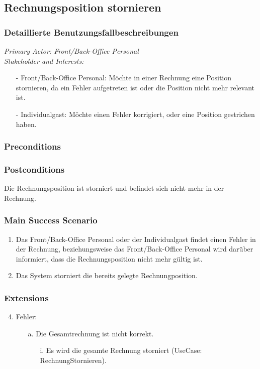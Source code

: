 \documentclass[./detailed_overview_usecases.tex]{subfiles}
\begin{document}
    \subsection{Rechnungsposition stornieren}
    \subsubsection{Detaillierte Benutzungsfallbeschreibungen}
    \textit{Primary Actor: Front/Back-Office Personal}
    \\
    \textit{Stakeholder and Interests:}
    \begin{itemize}
        \item[-] Front/Back-Office Personal: Möchte in einer Rechnung eine Position stornieren, da ein Fehler aufgetreten ist oder die Position nicht mehr relevant ist.
        \item[-] Individualgast: Möchte einen Fehler korrigiert, oder eine Position gestrichen haben.
    \end{itemize}

    \subsubsection*{Preconditions}

    \subsubsection*{Postconditions}
    Die Rechnungsposition ist storniert und befindet sich nicht mehr in der Rechnung.

    \subsubsection*{Main Success Scenario}
    \begin{enumerate}
        \item Das Front/Back-Office Personal oder der Individualgast findet einen Fehler in der Rechnung, beziehungsweise das Front/Back-Office Personal wird darüber informiert, dass die Rechnungsposition nicht mehr gültig ist.
        \item Das System storniert die bereits gelegte Rechnungposition.
    \end{enumerate}

    \subsubsection*{Extensions}
    \begin{enumerate}
        \setcounter{enumi}{3}
        \item Fehler:
        \begin{itemize}
            \item[a.] Die Gesamtrechnung ist nicht korrekt.
            \begin{itemize}
                \item[i.] Es wird die gesamte Rechnung storniert (UseCase: RechnungStornieren).
            \end{itemize}
        \end{itemize}
    \end{enumerate}
\end{document}

